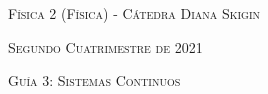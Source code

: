 \documentclass[11pt,spanish]{article}
\begin{document}
    \begin{center}
    \textsc{\large Física 2 (Física) - Cátedra Diana Skigin}
    \par\end{center}{\large \par}
    
    \begin{center}
    \textsc{\large Segundo Cuatrimestre de 2021}
    \par\end{center}{\large \par}
    
    \begin{center}
    \textsc{\large Guía 3: Sistemas Continuos}
    \par\end{center}{\large \par}
\end{document}
